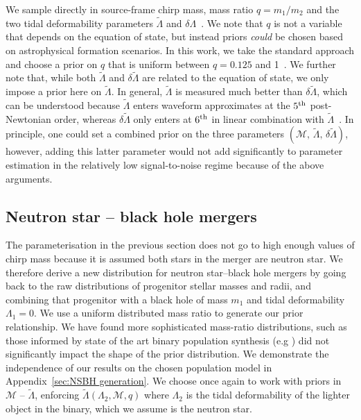 \documentclass[twocolumn]{aastex631}
\begin{document}
We sample directly in source-frame chirp mass, mass ratio $q=m_1/m_2$ and the two tidal deformability parameters $\tilde{\Lambda}$ and $\delta\Lambda$~\citep[see][for explicit expressions for these quantities]{favata14,wade14}. We note that $q$ is not a variable that depends on the equation of state, but instead priors \textit{could} be chosen based on astrophysical formation scenarios. In this work, we take the standard approach and choose a prior on $q$ that is uniform between $q=0.125$ and 1~\citep[e.g.,][]{romeroshaw20}.
We further note that, while both $\tilde{\Lambda}$ and $\delta\tilde{\Lambda}$ are related to the equation of state, we only impose a prior here on $\tilde{\Lambda}$. In general, $\tilde{\Lambda}$ is measured much better than $\delta\tilde{\Lambda}$, which can be understood because $\tilde{\Lambda}$ enters waveform approximates at the $5^{\rm th}$ post-Newtonian order, whereas $\delta\tilde{\Lambda}$ only enters at $6^{\rm th}$ in linear combination with $\tilde{\Lambda}$~\citep{wade14}. In principle, one could set a combined prior on the three parameters $(\mathcal{M},\,\tilde{\Lambda},\,\delta\tilde{\Lambda})$, however, adding this latter parameter would not add significantly to parameter estimation in the relatively low signal-to-noise regime because of the above arguments.
	
	
\subsection{Neutron star -- black hole mergers}
The parameterisation in the previous section does not go to high enough values of chirp mass because it is assumed both stars in the merger are neutron star. We therefore derive a new distribution for neutron star--black hole mergers by going back to the raw distributions of progenitor stellar masses and radii, and combining that progenitor with a black hole of mass $m_1$ and tidal deformability $\Lambda_1=0$.
We use a uniform  distributed mass ratio to generate our prior relationship. We have found more sophisticated mass-ratio distributions, such as those informed by state of the art binary population synthesis (e.g \citealt{2021Broekgaarden+}) did not significantly impact the shape of the prior distribution. We demonstrate the independence of our results on the chosen population model in Appendix~\ref{sec:NSBH generation}. 
We choose once again to work with priors in $\mathcal{M}$ -- $\tilde{\Lambda}$, enforcing $\tilde{\Lambda}(\Lambda_2,\mathcal{M},q)$ where $\Lambda_2$ is the tidal deformability of the lighter object in the binary, which we assume is the neutron star.
\end{document}
